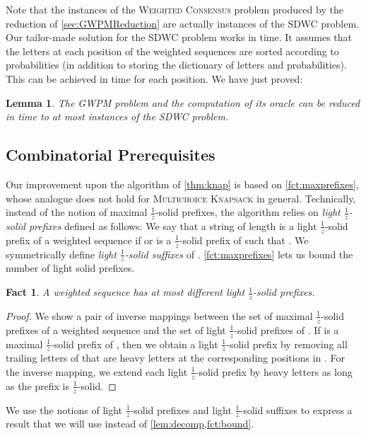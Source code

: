 \documentclass{article}
\theoremstyle{plain}
\newtheorem{lemma}[theorem]{Lemma}
\newtheorem{fact}[theorem]{Fact}
\theoremstyle{definition}
\newcommand{\MK}{\textsc{Multichoice Knapsack}\xspace}
\newcommand{\GWPM}{\textsc{GWPM}\xspace}
\newcommand{\WC}{\textsc{Weighted Consensus}\xspace}
\newcommand{\SDWC}{\textsc{SDWC}\xspace}
\newcommand{\fr}{\ensuremath{\frac1z}}
\newcommand{\mayqed}{}
\begin{document}
    Note that the instances of the \WC problem produced by the reduction of \cref{sec:GWPMReduction} are actually instances of the \SDWC problem.
    Our tailor-made solution for the \SDWC problem works in  time.    
    It assumes that the letters at each position of the weighted sequences are sorted according to probabilities
    (in addition to storing the dictionary of letters and probabilities).
    This can be achieved in  time for each position.
    We have just proved:
    
   
    \begin{lemma}\label{lem:sdwc}
      The \GWPM problem and the computation of its oracle can be reduced
      in  time to at most  instances of the \SDWC problem.
    \end{lemma}     
   
   \subsection{Combinatorial Prerequisites}
    Our improvement upon the algorithm of \cref{thm:knap} is based on \cref{fct:maxprefixes}, 
    whose analogue does not hold for \MK in general.
    Technically, instead of the notion of maximal \fr-solid prefixes, the algorithm
    relies on \emph{light \fr-solid prefixes} defined as follows:
    We say that a string  of length  is a light \fr-solid prefix of a weighted sequence  if  or
     is a \fr-solid prefix of  such that . 
    We symmetrically define \emph{light \fr-solid suffixes} of .
    \cref{fct:maxprefixes} lets us bound the number of light solid prefixes.

    \begin{fact}\label{fct:lightprefixes}
      A weighted sequence has at most  different light \fr-solid prefixes.
    \end{fact}
    \begin{proof}
      We show a pair of inverse mappings between the set of maximal \fr-solid prefixes of a weighted sequence  and the
      set of light \fr-solid prefixes of .
      If  is a maximal \fr-solid prefix of , then we obtain a light \fr-solid prefix 
      by removing all trailing letters of  that are heavy letters at the corresponding positions in . 
      For the inverse mapping, we extend each light \fr-solid prefix by heavy letters as long as the prefix is \fr-solid.
    \mayqed\end{proof} 
   
    
    We use the notions of light \fr-solid prefixes and light \fr-solid suffixes to express a result 
    that we will use instead of \cref{lem:decomp,fct:bound}.
    
\end{document}
